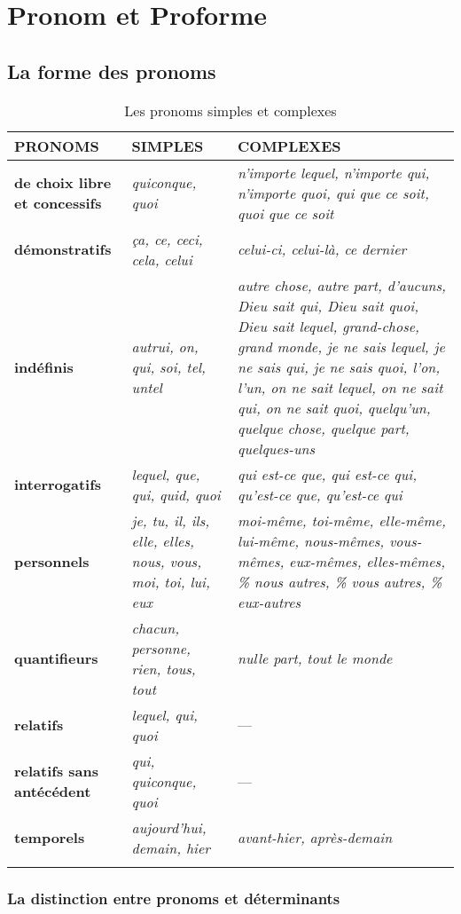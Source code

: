 \documentclass[UTF8]{report}
\begin{document}
\section{Pronom et Proforme}
\subsection{La forme des pronoms}
\begin{longtable}{|>{\raggedright\arraybackslash}p{4cm}|>{\raggedright\arraybackslash}p{5cm}|>{\raggedright\arraybackslash}p{6cm}|}
\hline
\rowcolor{cyan!20}
\textbf{PRONOMS} & \textbf{SIMPLES} & \textbf{COMPLEXES} \\
\hline
\textbf{de choix libre et concessifs} & \textit{quiconque, quoi} & \textit{n’importe lequel, n’importe qui, n’importe quoi, qui que ce soit, quoi que ce soit} \\
\hline
\textbf{démonstratifs} & \textit{ça, ce, ceci, cela, celui} & \textit{celui-ci, celui-là, ce dernier} \\
\hline
\textbf{indéfinis} & \textit{autrui, on, qui, soi, tel, untel} & 
\textit{autre chose, autre part, d’aucuns, Dieu sait qui, Dieu sait quoi, Dieu sait lequel, grand-chose, grand monde, je ne sais lequel, je ne sais qui, je ne sais quoi, l’on, l’un, on ne sait lequel, on ne sait qui, on ne sait quoi, quelqu’un, quelque chose, quelque part, quelques-uns} \\
\hline
\textbf{interrogatifs} & \textit{lequel, que, qui, quid, quoi} & \textit{qui est-ce que, qui est-ce qui, qu’est-ce que, qu’est-ce qui} \\
\hline
\textbf{personnels} & \textit{je, tu, il, ils, elle, elles, nous, vous, moi, toi, lui, eux} & 
\textit{moi-même, toi-même, elle-même, lui-même, nous-mêmes, vous-mêmes, eux-mêmes, elles-mêmes, \% nous autres, \% vous autres, \% eux-autres} \\
\hline
\textbf{quantifieurs} & \textit{chacun, personne, rien, tous, tout} & \textit{nulle part, tout le monde} \\
\hline
\textbf{relatifs} & \textit{lequel, qui, quoi} & — \\
\hline
\textbf{relatifs sans antécédent} & \textit{qui, quiconque, quoi} & — \\
\hline
\textbf{temporels} & \textit{aujourd’hui, demain, hier} & \textit{avant-hier, après-demain} \\
\hline
\caption{ Les pronoms simples et complexes}
\end{longtable}

\subsubsection{La distinction entre pronoms et déterminants}
\end{document}
